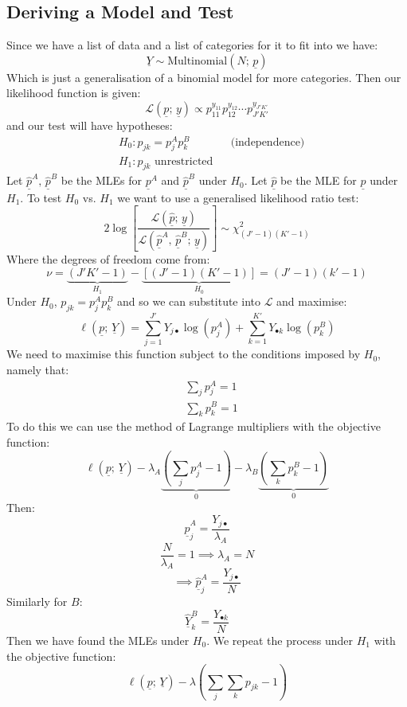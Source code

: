 \documentclass[12pt]{article}
\begin{document}
\subsection{Deriving a Model and Test}
Since we have a list of data and a list of categories for it to fit into we have:
\[\underline{Y}\sim\text{Multinomial}(N;\, \underline{p})\]
Which is just a generalisation of a binomial model for more categories. Then our likelihood function is given:
\[\mathcal{L}(\underline{p};\, \underline{y})\propto p_{11}^{y_{11}}p_{12}^{y_{12}}\cdots p_{J'K'}^{y_{J'K'}}\]
and our test will have hypotheses:
\begin{align*}
    &H_0:p_{jk}=p_j^Ap_k^B && \text{(independence)} \\
    &H_1: p_{jk} \text{ unrestricted}
\end{align*}
Let \(\underline{\hat{p}}^A,\, \underline{\hat{p}}^B\) be the MLEs for \(\underline{p}^A\) and \(\underline{\hat{p}}^B\) under \(H_0\). Let \(\underline{\hat{p}}\) be the MLE for \(\underline{p}\) under \(H_1\). To test \(H_0\) vs. \(H_1\) we want to use a generalised likelihood ratio test:
\[2\log\left[\frac{\mathcal{L}(\underline{\hat{p}};\, \underline{y})}{\mathcal{L}(\underline{\hat{p}}^A,\,\underline{\hat{p}}^B;\, \underline{y})}\right]\sim\chi^2_{(J'-1)(K'-1)}\]
Where the degrees of freedom come from:
\[\nu=\underbrace{(J'K'-1)}_{H_1}-\underbrace{[(J'-1)(K'-1)]}_{H_0}=(J'-1)(k'-1)\]
Under \(H_0\), \(p_{jk}=p_j^Ap_k^B\) and so we can substitute into \(\mathcal{L}\) and maximise:
\[\ell(\underline{p};\, \underline{Y})=\sum^{J'}_{j=1}Y_{j\bullet}\log(p_j^A)+\sum^{K'}_{k=1}Y_{\bullet k}\log(p_k^B)\]
We need to maximise this function subject to the conditions imposed by \(H_0\), namely that:
\begin{align*}
    &\sum_jp_j^A=1 \\
    &\sum_kp_k^B=1
\end{align*}
To do this we can use the method of Lagrange multipliers with the objective function:
\[\ell(\underline{p};\, \underline{Y})-\lambda_A\underbrace{\left(\sum_jp_j^A-1\right)}_{0}-\lambda_B\underbrace{\left(\sum_kp_k^B-1\right)}_{0}\]
Then:
\[\underline{\hat{p}}_j^A=\frac{Y_{j\bullet}}{\lambda_A}\]
\[\frac{N}{\lambda_A}=1\implies\lambda_A=N\]
\[\implies\underline{\hat{p}}^A_j=\frac{Y_{j\bullet}}{N}\]
Similarly for \(B\):
\[\underline{\hat{Y}}_k^B=\frac{Y_{\bullet k}}{N}\]
Then we have found the MLEs under \(H_0\). We repeat the process under \(H_1\) with the objective function:
\[\ell(\underline{p};\, \underline{Y})-\lambda\left(\sum_j\sum_kp_{jk}-1\right)\]
\end{document}
